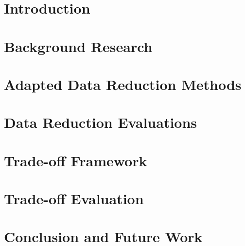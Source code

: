 \documentclass[msc,deptreport,dsti]{infthesis} %
\begin{document}
\chapter{Introduction}


\chapter{Background Research}


\chapter{Adapted Data Reduction Methods}


\chapter{Data Reduction Evaluations}


\chapter{Trade-off Framework}


\chapter{Trade-off Evaluation}


\chapter{Conclusion and Future Work}





% 
% 
% 
\end{document}
